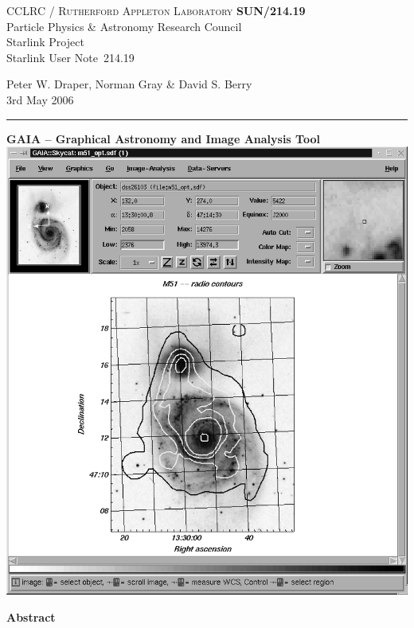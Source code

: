 \documentclass[twoside,11pt]{article}
\newcommand{\stardoccategory}  {Starlink User Note}
\newcommand{\stardocinitials}  {SUN}
\newcommand{\stardocnumber}    {214.19}
\newcommand{\stardocauthors}   {Peter W. Draper, Norman Gray \& David S. Berry}
\newcommand{\stardocdate}      {3rd May 2006}
\newcommand{\stardoctitle}     {GAIA -- Graphical Astronomy and Image Analysis Tool}
\newcommand{\stardocname}{\stardocinitials /\stardocnumber}
\newenvironment{latexonly}{}{}
\renewcommand{\_}{\texttt{\symbol{95}}}
\begin{document}
\thispagestyle{empty}

\begin{latexonly}
   CCLRC / \textsc{Rutherford Appleton Laboratory} \hfill \textbf{\stardocname}\\
   {\large Particle Physics \& Astronomy Research Council}\\
   {\large Starlink Project\\}
   {\large \stardoccategory\ \stardocnumber}
   \begin{flushright}
   \stardocauthors\\
   \stardocdate
   \end{flushright}
   \vspace{-4mm}
   \rule{\textwidth}{0.5mm}
   \vspace{5mm}
   \begin{center}
   {\Large\textbf{\stardoctitle \\ [2.5ex]}}
   \vspace{5mm}
   \includegraphics[totalheight=5in]{sun214fig.ps}
   \end{center}

   \begin{center}
      {\Large\textbf{Abstract}}
   \end{center}
\end{latexonly}
\end{document}
